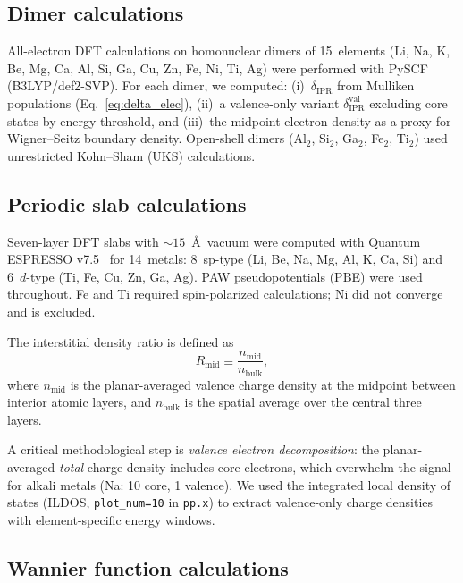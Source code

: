 \documentclass[twocolumn,showpacs,preprintnumbers,amsmath,amssymb,prb]{revtex4-2}
\begin{document}
\subsection{Dimer calculations}

All-electron DFT calculations on homonuclear dimers of 15~elements
(Li, Na, K, Be, Mg, Ca, Al, Si, Ga, Cu, Zn, Fe, Ni, Ti, Ag)
were performed with PySCF~\cite{PySCF2018}
(B3LYP/def2-SVP).
For each dimer, we computed:
(i)~$\delta_\mathrm{IPR}$ from Mulliken populations
    (Eq.~\eqref{eq:delta_elec}),
(ii)~a valence-only variant $\delta_\mathrm{IPR}^\mathrm{val}$
     excluding core states by energy threshold, and
(iii)~the midpoint electron density as a proxy for
     Wigner--Seitz boundary density.
Open-shell dimers (Al$_2$, Si$_2$, Ga$_2$, Fe$_2$, Ti$_2$)
used unrestricted Kohn--Sham (UKS) calculations.

\subsection{Periodic slab calculations}

Seven-layer DFT slabs with $\sim\!15$~\AA\ vacuum
were computed with Quantum ESPRESSO
v7.5~\cite{Giannozzi2009,Giannozzi2017} for 14~metals:
8~sp-type (Li, Be, Na, Mg, Al, K, Ca, Si)
and 6~$d$-type (Ti, Fe, Cu, Zn, Ga, Ag).
PAW pseudopotentials (PBE) were used throughout.
Fe and Ti required spin-polarized calculations;
Ni did not converge and is excluded.

The interstitial density ratio is defined as
\begin{equation}
  R_\mathrm{mid} \equiv
  \frac{n_\mathrm{mid}}{n_\mathrm{bulk}},
  \label{eq:rmid}
\end{equation}
where $n_\mathrm{mid}$ is the planar-averaged valence charge
density at the midpoint between interior atomic layers,
and $n_\mathrm{bulk}$ is the spatial average over the
central three layers.

A critical methodological step is \emph{valence electron
decomposition}: the planar-averaged \emph{total} charge density
includes core electrons, which overwhelm the signal
for alkali metals (Na: 10 core, 1 valence).
We used the integrated local density of states
(ILDOS, \texttt{plot\_num=10} in \texttt{pp.x}) to extract
valence-only charge densities with element-specific energy windows.

\subsection{Wannier function calculations}
\end{document}
